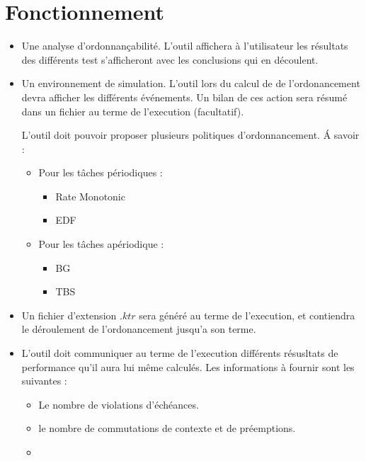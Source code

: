 \section{Fonctionnement}
\begin{itemize}
\item
Une analyse d'ordonnançabilité. L'outil affichera à l'utilisateur les résultats des différents test  s'afficheront avec les conclusions qui en découlent.
\item
Un environnement de simulation. L'outil lors du calcul de de l'ordonancement devra afficher les différents événements. Un bilan de ces action sera résumé dans un fichier au terme de l'execution (facultatif).

L'outil doit pouvoir proposer plusieurs politiques d'ordonnancement. \'A savoir : 
\begin{itemize}
\item
Pour les tâches périodiques :

\begin{itemize}
\item
Rate Monotonic
\item
EDF
\end{itemize}

\item
Pour les tâches apériodique : 
\begin{itemize}
\item
BG
\item
TBS
\end{itemize}

\end{itemize} 
\item
Un fichier d'extension $.ktr$ sera généré au terme de l'execution, et contiendra le déroulement de l'ordonancement jusqu'a son terme.
\item
L'outil doit communiquer au terme de l'execution différents résusltats de performance qu'il aura lui même calculés. Les informations à fournir sont les suivantes : 
\begin{itemize}
\item
Le nombre de violations d'échéances.
\item
le nombre de commutations de contexte et de préemptions.
\item

\end{itemize}
\end{itemize}

